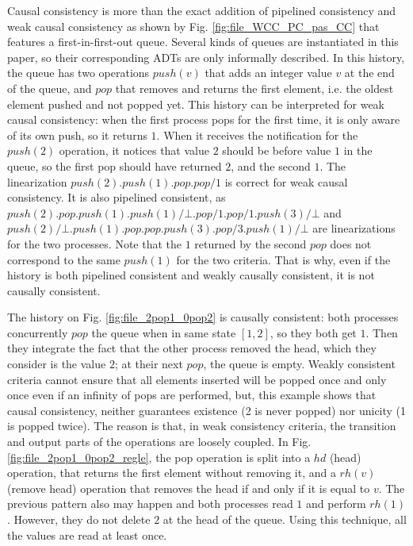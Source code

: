 \documentclass[9pt,numbers]{sigplanconf}
\begin{document}
Causal consistency is more than the exact addition of pipelined consistency and weak causal consistency as shown by 
Fig. \ref{fig:file_WCC_PC_pas_CC} that features a first-in-first-out queue. Several kinds of queues are 
instantiated in this paper, so their corresponding ADTs are only informally described.
In this history, the queue has two operations $push(v)$ that adds an integer value $v$ at the end of the queue, 
and $pop$ that removes and returns the first element, i.e. the oldest element pushed and not popped yet. 
This history can be interpreted for weak causal consistency: when the first process pops for the first time, it is only aware of 
its own push, so it returns $1$. When it receives the notification for the $push(2)$ operation,
it notices that value $2$ should be before value $1$ in the queue, so the first pop should have returned $2$, and
the second $1$. The linearization $push(2).push(1).pop.pop/1$ is correct for weak causal consistency. 
It is also pipelined consistent, as $push(2).pop.push(1).push(1)/\bot.pop/1.pop/1.push(3)/\bot$ and
$push(2)/\bot.push(1).pop.pop.push(3).pop/3.push(1)/\bot$ are linearizations for the two processes.
Note that the $1$ returned by the second $pop$ does not correspond to the same $push(1)$ for the two criteria.
That is why, even if the history is both pipelined consistent and weakly causally consistent, it is not causally consistent.

The history on Fig. \ref{fig:file_2pop1_0pop2} is causally consistent: both processes concurrently $pop$ the 
queue when in same state $[1, 2]$, so they both get $1$. Then they integrate the fact that the other process
removed the head, which they consider is the value $2$; at their next $pop$, the queue is empty. Weakly consistent criteria
cannot ensure that all elements inserted will be popped once and only once even if an infinity of pops are performed, 
but, this example shows that causal consistency, neither guarantees existence (2 is never popped) nor unicity (1 is popped twice). 
The reason is that, in weak consistency criteria, the transition and output parts of the operations are loosely coupled.
In Fig. \ref{fig:file_2pop1_0pop2_regle}, the pop operation is split into a $hd$ (head) operation, that returns the first element 
without removing it, and a $rh(v)$ (remove head) operation that removes the head if and only if it is equal to $v$. 
The previous pattern also may happen and both processes read $1$ and perform $rh(1)$.
However, they do not delete $2$ at the head of the queue. Using this technique, all the
values are read at least once.
\end{document}
